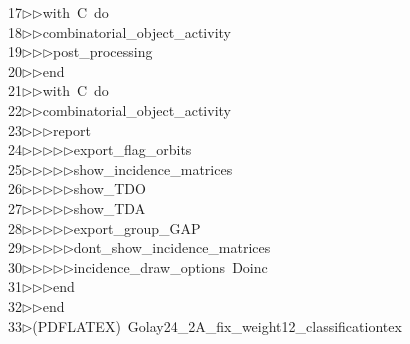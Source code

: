 \begin{tabbing}
17\>$\triangleright$\>$\triangleright$\>with\ C\ do\ \\[0pt]
18\>$\triangleright$\>$\triangleright$\>combinatorial\_object\_activity\ \\[0pt]
19\>$\triangleright$\>$\triangleright$\>$\triangleright$\>post\_processing\ \\[0pt]
20\>$\triangleright$\>$\triangleright$\>end\ \\[0pt]
21\>$\triangleright$\>$\triangleright$\>with\ C\ do\ \\[0pt]
22\>$\triangleright$\>$\triangleright$\>combinatorial\_object\_activity\ \\[0pt]
23\>$\triangleright$\>$\triangleright$\>$\triangleright$\>report\ \\[0pt]
24\>$\triangleright$\>$\triangleright$\>$\triangleright$\>$\triangleright$\>$\triangleright$\>export\_flag\_orbits\ \\[0pt]
25\>$\triangleright$\>$\triangleright$\>$\triangleright$\>$\triangleright$\>$\triangleright$\>show\_incidence\_matrices\ \\[0pt]
26\>$\triangleright$\>$\triangleright$\>$\triangleright$\>$\triangleright$\>$\triangleright$\>show\_TDO\ \\[0pt]
27\>$\triangleright$\>$\triangleright$\>$\triangleright$\>$\triangleright$\>$\triangleright$\>show\_TDA\ \\[0pt]
28\>$\triangleright$\>$\triangleright$\>$\triangleright$\>$\triangleright$\>$\triangleright$\>export\_group\_GAP\ \\[0pt]
29\>$\triangleright$\>$\triangleright$\>$\triangleright$\>$\triangleright$\>$\triangleright$\>dont\_show\_incidence\_matrices\ \\[0pt]
30\>$\triangleright$\>$\triangleright$\>$\triangleright$\>$\triangleright$\>$\triangleright$\>incidence\_draw\_options\ Doinc\ \\[0pt]
31\>$\triangleright$\>$\triangleright$\>$\triangleright$\>end\ \\[0pt]
32\>$\triangleright$\>$\triangleright$\>end\\[0pt]
33\>$\triangleright$\>(PDFLATEX)\ Golay24\_2A\_fix\_weight12\_classificationtex\\[0pt]

\end{tabbing}
